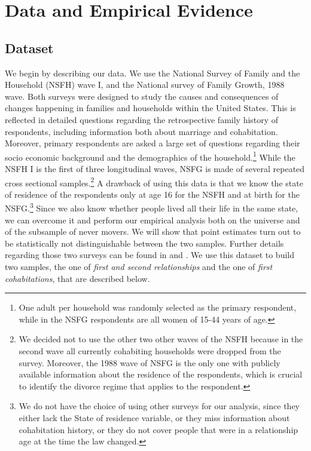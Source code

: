 \documentclass[12pt]{article}
\numberwithin{table}{section}
\begin{document}
\section{Data and Empirical Evidence}
\subsection{Dataset}\label{dataset}
We begin by describing our data. We use the National Survey of Family and the Household (NSFH) wave I, and the National survey of Family Growth, 1988 wave. Both surveys were designed to study the causes and consequences of changes happening in families and households within the United States. This is reflected in detailed questions regarding the retrospective family history of respondents, including information both about marriage and cohabitation. Moreover, primary respondents are asked a large set of questions regarding their socio economic background and the demographics of the household.\footnote{One adult per household was randomly selected as the primary respondent, while in the NSFG respondents are all women of 15-44 years of age.} While the NSFH I is the first of three longitudinal waves, NSFG is made of several repeated cross sectional samples.\footnote{We decided not to use the other two other waves of the NSFH because in the second wave all currently cohabiting households were dropped from the survey. Moreover, the 1988 wave of NSFG is the only one with publicly available information about the residence of the respondents, which is crucial to identify the divorce regime that applies to the respondent.} A drawback of using this data is that we know the state of residence of the respondents only at age 16 for the NSFH and at birth for the NSFG.\footnote{We do not have the choice of using other surveys for our analysis, since they either lack the State of residence variable, or they miss information about cohabitation history, or they do not cover people that were in a relationship age at the time the law changed.} Since we also know whether people lived all their life in the same state, we can overcome it and perform our empirical analysis both on the universe and of the subsample of never movers. We will show that point estimates turn out to be statistically not distinguishable between the two samples. Further details regarding those two surveys can be found in \cite{bumpass2017} and \cite{mosher1996}. We use this dataset to build two samples, the one of \textit{first and second relationships} and the one of \textit{first cohabitations}, that are described below.
  
\end{document}

